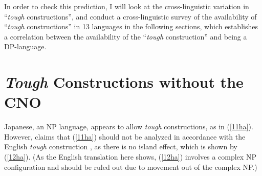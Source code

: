 \documentclass[output=paper,colorlinks,citecolor=brown,
]{langscibook}
\begin{document}
In order to check this prediction, I will look at the cross-linguistic variation in “\textit{tough} constructions”, and conduct a cross-linguistic survey of the availability of “\textit{tough} constructions” in 13 languages in the following sections, which establishes a correlation between the availability of the “\textit{tough} construction” and being a DP-language.

\section{\textit{Tough} Constructions without the CNO}
Japanese, an NP language, appears to allow \textit{tough} constructions, as in (\ref{11ha}). However, \citet{Takezawa1987} claims that (\ref{11ha}) should not be analyzed in accordance with the English \textit{tough} construction \citep{Chomsky1977}, as there is no island effect, which is shown by (\ref{12ha}). (As the English translation here shows, (\ref{12ha}) involves a complex NP configuration and should be ruled out due to movement out of the complex NP.) 
\end{document}
